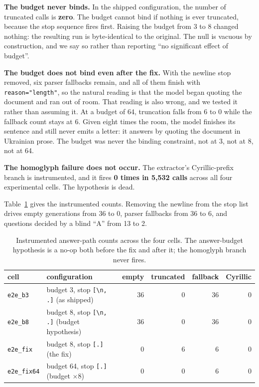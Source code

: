 \documentclass{article}
\begin{document}
\textbf{The budget never binds.} In the shipped configuration, the number of truncated calls is \textbf{zero}. The budget cannot bind if nothing is ever truncated, because the stop sequence fires first. Raising the budget from 3 to 8 changed nothing: the resulting run is byte-identical to the original. The null is vacuous by construction, and we say so rather than reporting ``no significant effect of budget''.

\textbf{The budget does not bind even after the fix.} With the newline stop removed, six parser fallbacks remain, and all of them finish with \verb|reason="length"|, so the natural reading is that the model began quoting the document and ran out of room. That reading is also wrong, and we tested it rather than assuming it. At a budget of 64, truncation falls from 6 to 0 while the fallback count stays at 6. Given eight times the room, the model finishes its sentence and still never emits a letter: it answers by quoting the document in Ukrainian prose. The budget was never the binding constraint, not at 3, not at 8, not at 64.

\textbf{The homoglyph failure does not occur.} The extractor's Cyrillic-prefix branch is instrumented, and it fires \textbf{0 times in 5,532 calls} across all four experimental cells. The hypothesis is dead.

Table~\ref{tab:cells} gives the instrumented counts. Removing the newline from the stop list drives empty generations from 36 to 0, parser fallbacks from 36 to 6, and questions decided by a blind ``A'' from 13 to 2.

\begin{table}
\centering
\begin{tabular}{llrrrr}
\toprule
\textbf{cell} & \textbf{configuration} & \textbf{empty} & \textbf{truncated} & \textbf{fallback} & \textbf{Cyrillic} \\
\midrule
\texttt{e2e\_b3}    & budget 3, stop \verb|[\n, .]| (as shipped)    & 36 & 0 & 36 & 0 \\
\texttt{e2e\_b8}    & budget 8, stop \verb|[\n, .]| (budget hypothesis) & 36 & 0 & 36 & 0 \\
\texttt{e2e\_fix}   & budget 8, stop \verb|[.]| (the fix)           & 0  & 6 & 6  & 0 \\
\texttt{e2e\_fix64} & budget 64, stop \verb|[.]| (budget $\times 8$) & 0  & 0 & 6  & 0 \\
\bottomrule
\end{tabular}
\caption{Instrumented answer-path counts across the four cells. The answer-budget hypothesis is a no-op both before the fix and after it; the homoglyph branch never fires.}
\label{tab:cells}
\end{table}
\end{document}
